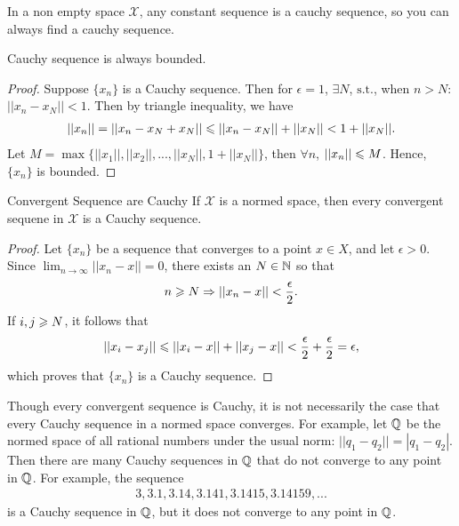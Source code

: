 \begin{remark}
    In a non empty space $\mathscr{X}$, any constant sequence is a cauchy sequence, so you can always find a cauchy sequence.
\end{remark}

\begin{proposition}{}{}
    Cauchy sequence is always bounded.
\end{proposition}
\begin{proof}
    Suppose $\{x_n\}$ is a Cauchy sequence. Then for $\epsilon=1$, $\exists N$, $\mathrm{s.t.}$, when $n>N$: $||x_n-x_N||<1$. 
    Then by  triangle inequality, we have
    \begin{align*}
        ||x_n|| = ||x_n-x_N+x_N||\leqslant ||x_n-x_N||+||x_N|| <1+||x_N||.
    \end{align*}
    Let $M=\max\{||x_1||,||x_2||,...,||x_N||,1+||x_N||\}$, then $\forall n$, $||x_n||\leqslant M$. Hence, $\{x_n\}$ is bounded.
\end{proof}

\begin{proposition}{Convergent Sequence are Cauchy}{}
    If $\mathscr{X}$ is a normed space, then every convergent sequene in $\mathscr{X}$ is a Cauchy sequence.
\end{proposition}
\begin{proof}
    Let $\{x_n\}$ be a sequence that converges to a point $x\in X$, and let $\epsilon>0$. Since $\lim_{n\rightarrow \infty}||x_n-x||=0$, there exists an $N\in \mathbb{N}$ so that
    \begin{align*}
        n\geqslant N\Rightarrow ||x_n-x||<\frac{\epsilon}{2}.
    \end{align*}
    If $i,j\geqslant N$, it follows that
    \begin{align*}
        ||x_i-x_j||\leqslant ||x_i-x||+||x_j-x||<\frac{\epsilon}{2} + \frac{\epsilon}{2}=\epsilon,
    \end{align*}
    which proves that $\{x_n\}$ is a Cauchy sequence.
\end{proof}
Though every convergent sequence is Cauchy, it is not necessarily the case that
every Cauchy sequence in a normed space converges. For example, let $\mathbb{Q}$ be the normed
space of all rational numbers under the usual norm: $||q_1-q_2||=|q_1-q_2|$. 
Then there are many Cauchy sequences in $\mathbb{Q}$ that do not converge to any point in $\mathbb{Q}$.
For example, the sequence
\begin{align*}
    3, 3.1, 3.14, 3.141, 3.1415, 3.14159, ...
\end{align*}
is a Cauchy sequence in $\mathbb{Q}$, but it does not converge to any point in $\mathbb{Q}$.

